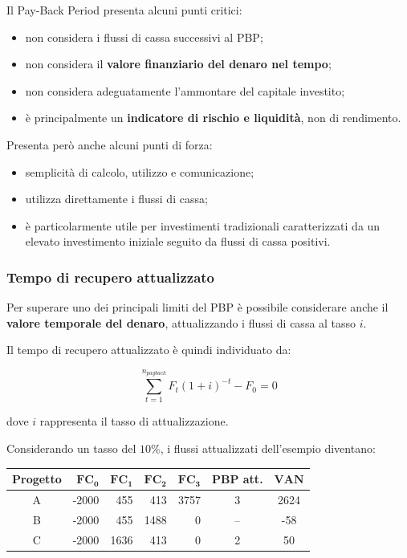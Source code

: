 \noindent Il Pay-Back Period presenta alcuni punti critici:

\begin{itemize}
    \item non considera i flussi di cassa successivi al PBP;
    \item non considera il \textbf{valore finanziario del denaro nel tempo};
    \item non considera adeguatamente l'ammontare del capitale investito;
    \item è principalmente un \textbf{indicatore di rischio e liquidità}, non di rendimento.
\end{itemize}

\noindent Presenta però anche alcuni punti di forza:

\begin{itemize}
    \item semplicità di calcolo, utilizzo e comunicazione;
    \item utilizza direttamente i flussi di cassa;
    \item è particolarmente utile per investimenti tradizionali caratterizzati 
    da un elevato investimento iniziale seguito da flussi di cassa positivi.
\end{itemize}

\subsubsection*{Tempo di recupero attualizzato}

\noindent Per superare uno dei principali limiti del PBP è possibile considerare anche il \textbf{valore temporale del denaro}, 
attualizzando i flussi di cassa al tasso $i$.

\noindent Il tempo di recupero attualizzato è quindi individuato da:

\[
\boxed{
\sum_{t=1}^{n_{payback}}
F_t(1+i)^{-t} - F_0 = 0
}
\]

\noindent dove $i$ rappresenta il tasso di attualizzazione.

\medskip

\noindent Considerando un tasso del $10\%$, i flussi attualizzati dell'esempio diventano:

\begin{center}
\begin{tabular}{|c|rrrr|c|c|}
\hline
\textbf{Progetto} & $\mathbf{FC_0}$ & $\mathbf{FC_1}$ & $\mathbf{FC_2}$ & $\mathbf{FC_3}$ &
\textbf{PBP att.} & $\mathbf{VAN}$ \\
\hline
A & -2000 & 455  & 413  & 3757 & 3 & 2624 \\
B & -2000 & 455  & 1488 & 0    & -- & -58 \\
C & -2000 & 1636 & 413  & 0    & 2 & 50 \\
\hline
\end{tabular}
\end{center}

